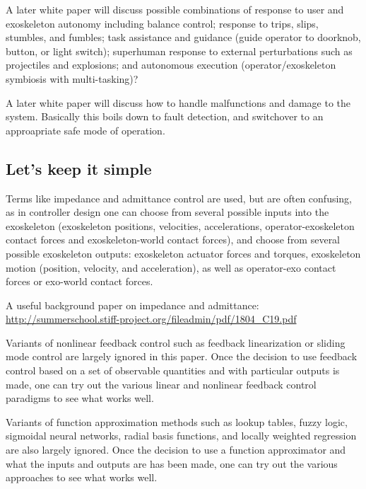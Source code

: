 \documentclass[letterpaper,12pt,fullpage]{article}
\begin{document}
A later white paper will discuss
possible combinations of response to user and exoskeleton
autonomy including balance control; response to trips, slips,
stumbles, and fumbles; task assistance and guidance (guide operator to
doorknob, button, or light switch); superhuman response to external
perturbations such as projectiles and explosions; and autonomous
execution (operator/exoskeleton symbiosis with multi-tasking)?

A later white paper will discuss how to handle malfunctions and damage to the
system. Basically this boils down to fault detection, and switchover to
an approapriate safe mode of operation.

\subsection{Let's keep it simple}

Terms like impedance and admittance control are used, but are often confusing,
as in controller design one can choose from several possible
inputs into the exoskeleton (exoskeleton positions,
velocities, accelerations, operator-exoskeleton contact forces and
exoskeleton-world contact forces), and choose from several possible exoskeleton
outputs: exoskeleton actuator forces and torques, exoskeleton
motion (position, velocity, and acceleration), as well as operator-exo
contact forces or exo-world contact forces.

A useful background paper on impedance and admittance:\\
\url{http://summerschool.stiff-project.org/fileadmin/pdf/1804_C19.pdf}

Variants of nonlinear feedback control such as feedback linearization or
sliding mode control are largely ignored in this paper.
Once the decision to use feedback control
based on a set of observable quantities and with particular outputs is made,
one can try out the various linear and nonlinear feedback control paradigms
to see what works well.

Variants of function approximation methods such as lookup tables, fuzzy logic,
sigmoidal neural networks, radial basis functions, and locally weighted regression
are also largely ignored. Once the decision to use a function approximator
and what the inputs and outputs are has been made, one can try out the various
approaches to see what works well.
\end{document}
